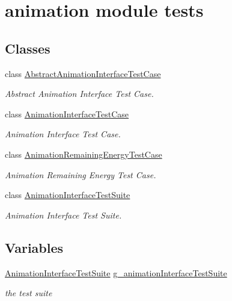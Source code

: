 \hypertarget{group__netanim-test}{}\section{animation module tests}
\label{group__netanim-test}
\subsection*{Classes}
\begin{DoxyCompactItemize}
\item 
class \hyperlink{classAbstractAnimationInterfaceTestCase}{Abstract\+Animation\+Interface\+Test\+Case}
\begin{DoxyCompactList}\small\item\em Abstract Animation Interface Test Case. \end{DoxyCompactList}\item 
class \hyperlink{classAnimationInterfaceTestCase}{Animation\+Interface\+Test\+Case}
\begin{DoxyCompactList}\small\item\em Animation Interface Test Case. \end{DoxyCompactList}\item 
class \hyperlink{classAnimationRemainingEnergyTestCase}{Animation\+Remaining\+Energy\+Test\+Case}
\begin{DoxyCompactList}\small\item\em Animation Remaining Energy Test Case. \end{DoxyCompactList}\item 
class \hyperlink{classAnimationInterfaceTestSuite}{Animation\+Interface\+Test\+Suite}
\begin{DoxyCompactList}\small\item\em Animation Interface Test Suite. \end{DoxyCompactList}\end{DoxyCompactItemize}
\subsection*{Variables}
\begin{DoxyCompactItemize}
\item 
\hyperlink{classAnimationInterfaceTestSuite}{Animation\+Interface\+Test\+Suite} \hyperlink{group__netanim-test_ga6c3e8c675de6bf21d861d7aba4a6b276}{g\+\_\+animation\+Interface\+Test\+Suite}
\begin{DoxyCompactList}\small\item\em the test suite \end{DoxyCompactList}\end{DoxyCompactItemize}



